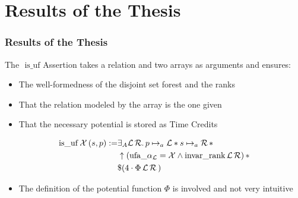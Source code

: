 \section{Results of the Thesis}
\begin{frame}
	\frametitle{Results of the Thesis}
	The $\,\,\mathrm{is\_uf}$ Assertion takes a relation and two arrays as arguments and ensures:\begin{itemize}
		\item The well-formedness of the disjoint set forest and the ranks
		\item That the relation modeled by the array is the one given
		\item That the necessary potential is stored as Time Credits
	\end{itemize}
	\vspace{0.6cm}
	\begin{dfn}
	\begin{align}
	\begin{split}
	\mathrm{is\_uf}\, \mathcal{X} \, (s,p) := 
	&\exists_A \mathcal{L}\, \mathcal{R}.\, p \mapsto_a \mathcal{L} * s \mapsto_a \mathcal{R}\, * \\
	&\uparrow (\mathrm{ufa\_}\alpha_\mathcal{L} = \mathcal{X} \land \mathrm{invar\_rank}\, \mathcal{L} \, \mathcal{R})\, * \\
	&\$(4\cdot\Phi\, \mathcal{L}\, \mathcal{R}\,)
	\end{split}
	\end{align}
	\end{dfn}
\vspace{-0.5cm}
\begin{itemize}
	\item The definition of the potential function $\Phi$ is involved and not very intuitive
\end{itemize}
\end{frame}

